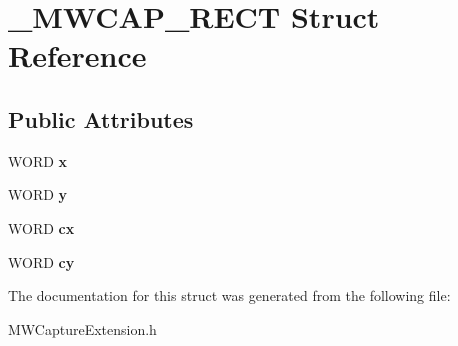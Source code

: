 \hypertarget{struct__MWCAP__RECT}{\section{\-\_\-\-M\-W\-C\-A\-P\-\_\-\-R\-E\-C\-T Struct Reference}
\label{struct__MWCAP__RECT}
}
\subsection*{Public Attributes}
\begin{DoxyCompactItemize}
\item 
\hypertarget{struct__MWCAP__RECT_a841a224cd6b3962db89f3203461917f1}{W\-O\-R\-D {\bfseries x}}\label{struct__MWCAP__RECT_a841a224cd6b3962db89f3203461917f1}

\item 
\hypertarget{struct__MWCAP__RECT_a04484cdd61a454e9346f94f429c9e3e1}{W\-O\-R\-D {\bfseries y}}\label{struct__MWCAP__RECT_a04484cdd61a454e9346f94f429c9e3e1}

\item 
\hypertarget{struct__MWCAP__RECT_aebe2486c4c8d90fc2443ce8a60acfa47}{W\-O\-R\-D {\bfseries cx}}\label{struct__MWCAP__RECT_aebe2486c4c8d90fc2443ce8a60acfa47}

\item 
\hypertarget{struct__MWCAP__RECT_a3356e845983a3343481308deac3b0a57}{W\-O\-R\-D {\bfseries cy}}\label{struct__MWCAP__RECT_a3356e845983a3343481308deac3b0a57}

\end{DoxyCompactItemize}


The documentation for this struct was generated from the following file\-:\begin{DoxyCompactItemize}
\item 
M\-W\-Capture\-Extension.\-h\end{DoxyCompactItemize}
